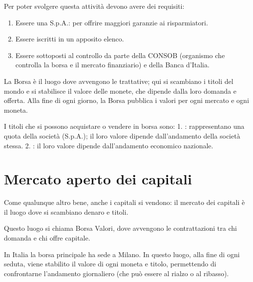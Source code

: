 \documentclass[letterpaper,10pt,italian]{sphinxmanual}
\begin{document}
\sphinxAtStartPar
Per poter svolgere questa attività devono avere dei requisiti:
\begin{enumerate}
%
\item {} 
\sphinxAtStartPar
Essere una S.p.A.: per offrire maggiori garanzie ai risparmiatori.

\item {} 
\sphinxAtStartPar
Essere iscritti in un apposito elenco.

\item {} 
\sphinxAtStartPar
Essere sottoposti al controllo da parte della CONSOB (organismo che controlla la borsa e il mercato finanziario) e della Banca d’Italia.

\end{enumerate}

\sphinxAtStartPar
{}

\sphinxAtStartPar
La Borsa è il luogo dove avvengono le trattative; qui si scambiano i titoli del mondo e si stabilisce il valore delle monete, che dipende dalla loro domanda e offerta. Alla fine di ogni giorno, la Borsa pubblica i valori per ogni mercato e ogni moneta.

\sphinxAtStartPar
I titoli che si possono acquistare o vendere in borsa sono:
1. : rappresentano una quota della società (S.p.A.); il loro valore dipende dall’andamento della società stessa.
2. : il loro valore dipende dall’andamento economico nazionale.

\sphinxstepscope


\chapter{Mercato aperto dei capitali}
\label{\detokenize{Mercato aperto dei capitali:mercato-aperto-dei-capitali}}\label{\detokenize{Mercato aperto dei capitali::doc}}
\sphinxAtStartPar
Come qualunque altro bene, anche i capitali si vendono:
il mercato dei capitali è il luogo dove si scambiano denaro e titoli.

\sphinxAtStartPar
Questo luogo si chiama Borsa Valori, dove avvengono le contrattazioni tra chi domanda e chi offre capitale.

\sphinxAtStartPar
In Italia la borsa principale ha sede a Milano.
In questo luogo, alla fine di ogni seduta, viene stabilito il valore di ogni moneta e titolo, permettendo di confrontarne l’andamento giornaliero (che può essere al rialzo o al ribasso).
\end{document}
